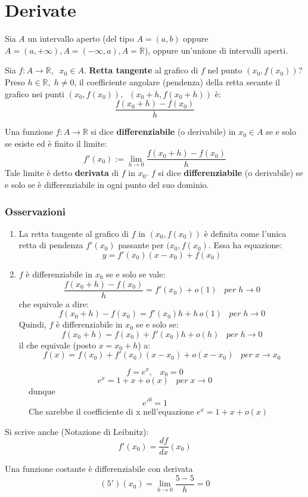 \documentclass[a4paper]{article}
\theoremstyle{break}
\theoremstyle{break}
\theoremstyle{break}
\theoremstyle{break}
\begin{document}
\section{Derivate}
Sia \( A \) un intervallo aperto (del tipo \( A=(a,b) \) oppure \( A=(a,+\infty), A=(-\infty, a), A=\mathbb{R} \)),
oppure un'unione di intervalli aperti.

Sia \( f: A \to \mathbb{R},\;\;x_0 \in A \). \textbf{Retta tangente} al grafico di \( f \) nel
punto \( (x_0, f(x_0)) \)? 
\label{D1}
Preso \( h \in \mathbb{R},\; h \neq 0 \), il coefficiente angolare (pendenza) della retta secante
il grafico nei punti \( (x_0, f(x_0)), \;\; (x_0+h, f(x_0+h)) \) è:
\[
\frac{f(x_0+h)-f(x_0)}{h}
\] 

\begin{definition}
    Una funzione \( f: A \to \mathbb{R} \) si dice \textbf{differenziabile} (o derivabile)
    in \( x_0 \in A \) se e solo se esiste ed è finito il limite:
    \[
    f'(x_0):= \lim_{h \to 0} \frac{f(x_0+h)-f(x_0)}{h}
    \] 
    Tale limite è detto \textbf{derivata} di \( f \) in \( x_0 \). \( f \) si dice
    \textbf{differenziabile} (o derivabile) se e solo se è differenziabile in ogni punto
    del suo dominio.
\end{definition}

\subsubsection{Osservazioni}
\begin{enumerate}
    \item La retta tangente al grafico di \( f \) in \( (x_0, f(x_0)) \) è definita
        come l'unica retta di pendenza \( f'(x_0) \) passante per \( (x_0, f(x_0) \).
        Essa ha equazione:
        \[
        y = f'(x_0)(x-x_0) + f(x_0)
        \] 
    \item \( f \) è differenziabile in \( x_0 \) se e solo se vale:
        \[
            \frac{f(x_0+h)-f(x_0)}{h}=f'(x_0) + o(1)\;\;\; per\;h \to 0
        \] 
        che equivale a dire:
        \[
        f(x_0+h)-f(x_0)=f'(x_0)h+h\,o(1)\;\;\; per\;h \to 0
        \] 
        Quindi, \( f \) è differenziabile in \( x_0 \) se e solo se:
        \[
        f(x_0+h)=f(x_0)+f'(x_0)h + o(h) \;\;\; per\;h \to 0
        \] 
        il che equivale (posto \( x=x_0+h \)) a:
        \[
        f(x)=f(x_0)+f'(x_0)(x-x_0)+o(x-x_0)\;\;\; per\;x \to x_0
        \] 
\end{enumerate}
\begin{figure}[H]
    \begin{example}
        \[
            f=e^x,\;\;\; x_0=0
        \] 
        \label{D2}
        \[
            e^x = 1 + x + o(x)\;\;\; per\;x \to 0
        \] 
        dunque
        \[
            e'^0=1
        \] 
        Che sarebbe il coefficiente di x nell'equazione \( e^x=1+x+o(x) \) 
    \end{example}
\end{figure}
Si scrive anche (Notazione di Leibnitz):
\[
f'(x_0) = \frac{df}{dx}(x_0)
\] 
\begin{example}
    Una funzione costante è differenziabile con derivata
    \[
        (5')(x_0)= \lim_{h \to 0} \frac{5-5}{h} = 0
    \] 
\end{example}
\end{document}
